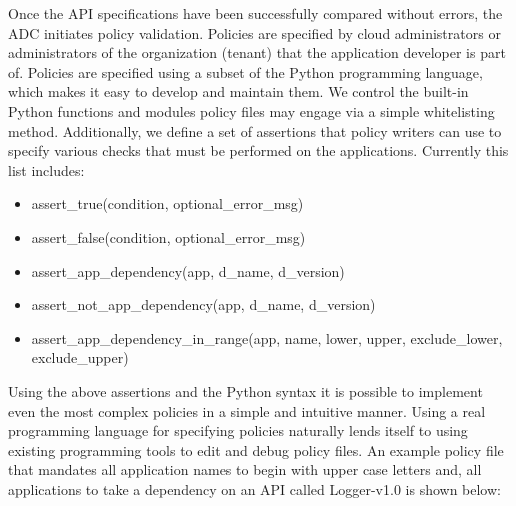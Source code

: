 
Once the API specifications have been successfully compared without errors, the ADC initiates policy validation. Policies
are specified by cloud administrators or administrators of the organization (tenant) that the application developer is part of. Policies are specified using
a subset of the Python programming language, which makes it easy to develop and maintain them. We control the built-in Python functions and
modules policy files may engage via a simple whitelisting method. Additionally, we define a set of assertions that policy writers can use to specify
various checks that must be performed on the applications. Currently this list includes:

\begin{itemize}
\item assert\_true(condition, optional\_error\_msg)
\item assert\_false(condition, optional\_error\_msg)
\item assert\_app\_dependency(app, d\_name, d\_version)
\item assert\_not\_app\_dependency(app, d\_name, d\_version)
\item assert\_app\_dependency\_in\_range(app, name, lower, upper, exclude\_lower, exclude\_upper)
\end{itemize}

Using the above assertions and the Python syntax it is possible to implement even the most complex policies in a simple and intuitive manner.
Using a real programming language for specifying policies naturally lends itself to using existing programming tools to edit and debug policy files. An example
policy file that mandates all application names to begin with upper case letters and, all applications to take a dependency on an API called Logger-v1.0
is shown below:

